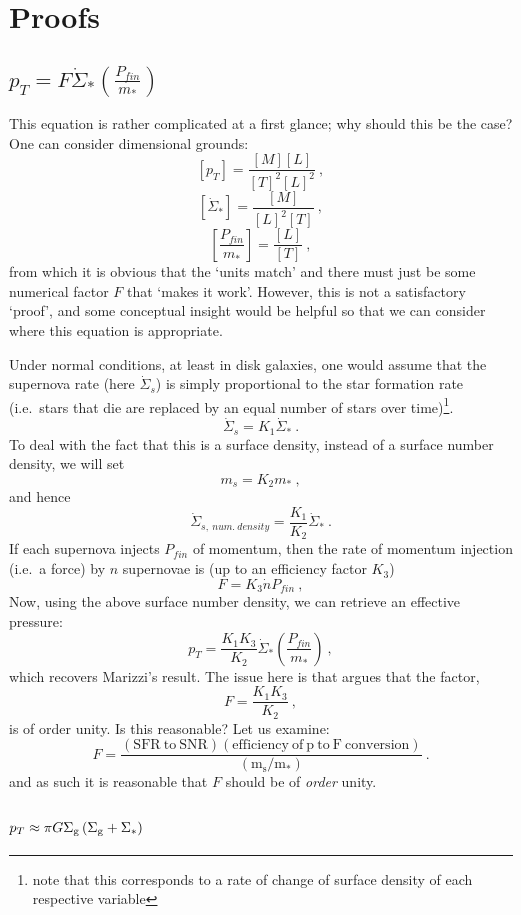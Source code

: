 \section{Proofs}\label{app:proofs}

\subsection{$p_T = F \dot{\Sigma}_*\left(\frac{P_{fin}}{m_*}\right)$}\label{proof-of-p_t-f-dotsigma_leftfracp_finm_right}

This equation is rather complicated at a first glance; why should this
be the case? One can consider dimensional grounds:
\[
    [p_T] = \frac{[M][L]}{[T]^2[L]^2}~,
\]
\[
    [\dot{\Sigma}_*] = \frac{[M]}{[L]^2[T]}~,
\]
\[
    \left[\frac{P_{fin}}{m_*}\right] = \frac{[L]}{[T]}~,
\]
from which it is obvious that the `units match' and there must just be
some numerical factor \(F\) that `makes it work'. However, this is not a
satisfactory `proof', and some conceptual insight would be helpful so
that we can consider where this equation is appropriate.

Under normal conditions, at least in disk galaxies, one would assume
that the supernova rate (here \(\dot{\Sigma}_s\)) is simply proportional
to the star formation rate (i.e.~stars that die are replaced by an equal
number of stars over time)\footnote{note that this corresponds to a rate
of change of surface density of each respective variable}.
\[
    \dot{\Sigma}_s = K_1 \dot{\Sigma}_*~.
\]
To deal with the fact that this is a surface density, instead of a
surface number density, we will set
\[
    m_s = K_2 m_*~,
\]
and hence
\[
    \dot{\Sigma}_{s, ~num. ~density} = \frac{K_1}{K_2} \dot{\Sigma}_*~.
\]
If each supernova injects \(P_{fin}\) of momentum, then the rate of
momentum injection (i.e.~a force) by \(n\) supernovae is (up to an
efficiency factor \(K_3\))
\[
    F = K_3\dot{n}P_{fin}~,
\]
Now, using the above surface number density, we can retrieve an effective
pressure:
\[
    p_T = \frac{K_1 K_3}{K_2} \dot{\Sigma}_* \left(\frac{P_{fin}}{m_*}\right)~,
\]
which recovers Marizzi's result. The issue here is that \citet{martizzi_supernova_2016}
argues that the factor,
\[
    F = \frac{K_1 K_3}{K_2}~,
\]
is of order unity. Is this reasonable? Let us examine:
\[
    F = \frac{(\mathrm{SFR ~to ~SNR}) (\mathrm{efficiency ~of ~p ~to ~F ~conversion})}{(\mathrm{m_s/m_*})}~.
\]
and as such it is reasonable that $F$ should be of \emph{order} unity.


\subsection{$p_T \approx \pi G \Sigma_\mathrm{g} \left(\Sigma_\mathrm{g} + \Sigma_*\right)$}

